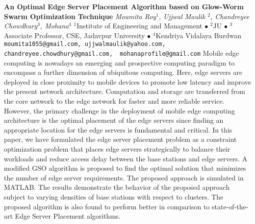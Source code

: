 
    \begin{conf-abstract}[]
        {\textbf{An Optimal Edge Server Placement Algorithm based on Glow-Worm Swarm Optimization Technique}}
        {\textit{Moumita Roy$^{1}$, Ujjwal Maulik $^{2}$, Chandreyee Chowdhury$^{3}$, Mohana$^{4}$}}
        {$^{1}$Institute of Engineering and Management $\bullet$ $^{2}$JU $\bullet$ $^{3}$Associate Professor, CSE, Jadavpur University $\bullet$ $^{4}$Kendriya Vidalaya Burdwan}
        {\texttt{moumita1055@gmail.com, ujjwalmaulik@yahoo.com, chandreyee.chowdhury@gmail.com,  mohanaprofile@gmail.com}}
        {Mobile edge computing is nowadays an emerging and prospective computing paradigm to encompass a further dimension of ubiquitous computing. Here, edge servers are deployed in close proximity to mobile devices to promote low latency and improve the present network architecture. Computation and storage are transferred from the core network to the edge network for faster and more reliable service. However, the primary challenge in the deployment of mobile edge computing architecture is the optimal placement of the edge servers since finding an appropriate location for the edge servers is fundamental and critical. In this paper, we have formulated the edge server placement problem as a constraint optimization problem that places edge servers strategically to balance their workloads and reduce access delay between the base stations and edge servers. A modified GSO algorithm is proposed to find the optimal solution that minimizes the number of edge server requirements. The proposed approach is simulated in MATLAB. The results demonstrate the behavior of the proposed approach subject to varying densities of base stations with respect to clusters. The proposed algorithm is also found to perform better in comparison to state-of-the-art Edge Server Placement algorithms.}
    \end{conf-abstract}
        
